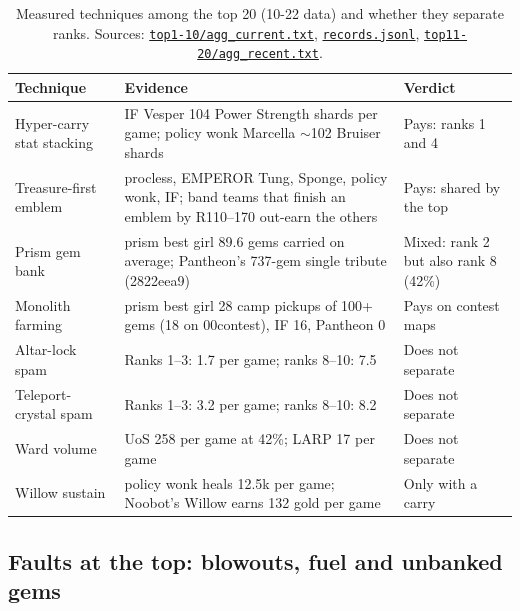 \documentclass[11pt,a4paper]{article}
\newcommand{\scratch}{file:///private/tmp/claude-501/-Users-tristanbasri-Desktop-Code-cambridge-battlecode-s2/b3f4cb6b-e46a-405f-957c-42c44c05c8dc/scratchpad/ladder-data}
\begin{document}
\begin{table}[H]
\centering\small
\caption{Measured techniques among the top 20 (10-22 data) and whether they separate ranks. Sources: \href{\scratch/top1-10/agg_current.txt}{\texttt{top1-10/agg\_current.txt}}, \href{\scratch/top1-10/records.jsonl}{\texttt{records.jsonl}}, \href{\scratch/top11-20/agg_recent.txt}{\texttt{top11-20/agg\_recent.txt}}.}
\begin{tabularx}{\linewidth}{@{}>{\raggedright}p{3.0cm} X >{\raggedright\arraybackslash}p{3.4cm}@{}}
\toprule
Technique & Evidence & Verdict\\
\midrule
Hyper-carry stat stacking & IF Vesper 104 Power Strength shards per game; policy wonk Marcella ${\sim}$102 Bruiser shards & \textcolor{cGood}{Pays}: ranks 1 and 4\\
Treasure-first emblem & procless, EMPEROR Tung, Sponge, policy wonk, IF; band teams that finish an emblem by R110--170 out-earn the others & \textcolor{cGood}{Pays}: shared by the top\\
Prism gem bank & prism best girl 89.6 gems carried on average; Pantheon's 737-gem single tribute (2822eea9) & \textcolor{cInk}{Mixed}: rank 2 but also rank 8 (42\%)\\
Monolith farming & prism best girl 28 camp pickups of 100+ gems (18 on 00contest), IF 16, Pantheon 0 & \textcolor{cGood}{Pays} on contest maps\\
Altar-lock spam & Ranks 1--3: 1.7 per game; ranks 8--10: 7.5 & \textcolor{cBad}{Does not separate}\\
Teleport-crystal spam & Ranks 1--3: 3.2 per game; ranks 8--10: 8.2 & \textcolor{cBad}{Does not separate}\\
Ward volume & UoS 258 per game at 42\%; LARP 17 per game & \textcolor{cBad}{Does not separate}\\
Willow sustain & policy wonk heals 12.5k per game; Noobot's Willow earns 132 gold per game & \textcolor{cInk}{Only with a carry}\\
\bottomrule
\end{tabularx}
\label{tab:tech}
\end{table}

\subsection{Faults at the top: blowouts, fuel and unbanked gems}
\end{document}

